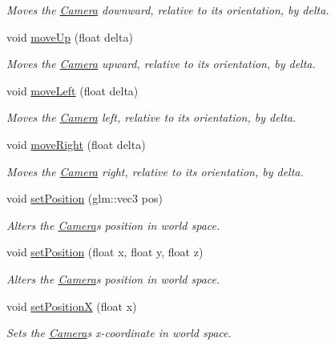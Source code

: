\begin{DoxyCompactItemize}
\begin{DoxyCompactList}\small\item\em Moves the \hyperlink{classtsgl_1_1_camera}{Camera} downward, relative to its orientation, by delta. \end{DoxyCompactList}\item 
void \hyperlink{classtsgl_1_1_camera_a60a565d006b727c305567d36b13e6e08}{move\+Up} (float delta)
\begin{DoxyCompactList}\small\item\em Moves the \hyperlink{classtsgl_1_1_camera}{Camera} upward, relative to its orientation, by delta. \end{DoxyCompactList}\item 
void \hyperlink{classtsgl_1_1_camera_a9cd60e2a3e521263a548700d08c73cb3}{move\+Left} (float delta)
\begin{DoxyCompactList}\small\item\em Moves the \hyperlink{classtsgl_1_1_camera}{Camera} left, relative to its orientation, by delta. \end{DoxyCompactList}\item 
void \hyperlink{classtsgl_1_1_camera_ab69a0968bb1076b9303c6d10c07bbd75}{move\+Right} (float delta)
\begin{DoxyCompactList}\small\item\em Moves the \hyperlink{classtsgl_1_1_camera}{Camera} right, relative to its orientation, by delta. \end{DoxyCompactList}\item 
void \hyperlink{classtsgl_1_1_camera_aeb5d5fb50a80951a307b03d66e56eb17}{set\+Position} (glm\+::vec3 pos)
\begin{DoxyCompactList}\small\item\em Alters the \hyperlink{classtsgl_1_1_camera}{Camera}\textquotesingle{}s position in world space. \end{DoxyCompactList}\item 
void \hyperlink{classtsgl_1_1_camera_a6cb0b89abb559c839616c554554adfb4}{set\+Position} (float x, float y, float z)
\begin{DoxyCompactList}\small\item\em Alters the \hyperlink{classtsgl_1_1_camera}{Camera}\textquotesingle{}s position in world space. \end{DoxyCompactList}\item 
void \hyperlink{classtsgl_1_1_camera_a928177f16143b27b88de7ecf30d797ae}{set\+PositionX} (float x)
\begin{DoxyCompactList}\small\item\em Sets the \hyperlink{classtsgl_1_1_camera}{Camera}\textquotesingle{}s x-\/coordinate in world space. \end{DoxyCompactList}\item 

\end{DoxyCompactItemize}
